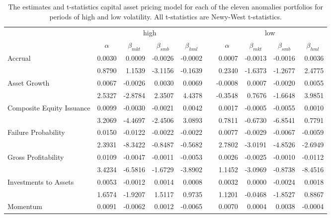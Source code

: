 \begin{table}[]
    \caption{\newline The estimates and t-statistics capital asset pricing model for each of the eleven anomalies portfolios for periods of high and low volatility. All t-statistics are Newy-West t-statistics.}
    \label{tab:vol-ff3}
    \begin{tabular}{@{}lrrrrlrrrr@{}}
    \toprule
    \multicolumn{1}{c}{} & \multicolumn{4}{c}{high} &  & \multicolumn{4}{c}{low} \\ \cmidrule(lr){2-5} \cmidrule(l){7-10} 
    \multicolumn{1}{c}{} & \multicolumn{1}{c}{$\alpha$} & \multicolumn{1}{c}{$\beta_{mkt}$} & \multicolumn{1}{c}{$\beta_{smb}$} & \multicolumn{1}{c}{$\beta_{hml}$} &  & \multicolumn{1}{c}{$\alpha$} & \multicolumn{1}{c}{$\beta_{mkt}$} & \multicolumn{1}{c}{$\beta_{smb}$} & \multicolumn{1}{c}{$\beta_{hml}$} \\ \midrule
    Accrual & 0.0030 & 0.0009 & -0.0026 & -0.0002 &  & 0.0007 & -0.0013 & -0.0016 & 0.0036 \\
        & 0.8790 & 1.1539 & -3.1156 & -0.1639 &  & 0.2340 & -1.6373 & -1.2677 & 2.4775 \\
    Asset Growth & 0.0067 & -0.0026 & 0.0030 & 0.0069 &  & -0.0008 & 0.0007 & -0.0020 & 0.0055 \\
        & 2.5327 & -2.8784 & 2.3507 & 4.4378 &  & -0.3548 & 0.7676 & -1.6648 & 3.9851 \\
    Composite Equity Issuance & 0.0099 & -0.0030 & -0.0021 & 0.0042 &  & 0.0017 & -0.0005 & -0.0055 & 0.0010 \\
        & 3.2069 & -4.4697 & -2.4506 & 3.0893 &  & 0.7811 & -0.6730 & -6.8541 & 0.7791 \\
    Failure Probability & 0.0150 & -0.0122 & -0.0022 & -0.0022 &  & 0.0077 & -0.0029 & -0.0067 & -0.0059 \\
        & 2.3931 & -8.3422 & -0.8487 & -0.5682 &  & 2.7802 & -3.0191 & -4.8526 & -2.6949 \\
    Gross Profitability & 0.0109 & -0.0047 & -0.0011 & -0.0053 &  & 0.0026 & -0.0025 & -0.0010 & -0.0112 \\
        & 3.4234 & -6.5816 & -1.6729 & -3.8902 &  & 1.1452 & -3.0969 & -0.8738 & -8.4516 \\
    Investments to Assets & 0.0053 & -0.0012 & 0.0014 & 0.0008 &  & 0.0032 & 0.0000 & -0.0024 & 0.0018 \\
        & 1.6574 & -1.9207 & 1.5117 & 0.9735 &  & 1.1201 & -0.0468 & -1.8527 & 0.8867 \\
    Momentum & 0.0091 & -0.0062 & 0.0012 & -0.0065 &  & 0.0070 & 0.0004 & 0.0038 & -0.0004 \\

\end{tabular}
\end{table}
